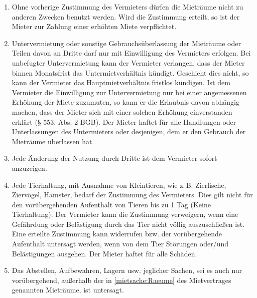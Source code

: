 \documentclass{scrreprt}[12pt,a4paper,twoside,duplex]
\begin{document}
\begin{contract}

\begin{enumerate}
  \item Ohne vorherige Zustimmung des Vermieters dürfen die Mieträume nicht zu
  anderen Zwecken benutzt werden. Wird die Zustimmung erteilt, so ist der Mieter
  zur Zahlung einer erhöhten Miete verpflichtet.
  \item Untervermietung oder sonstige Gebrauchsüberlassung der Mieträume oder
  Teilen davon an Dritte darf nur mit Einwilligung des Vermieters erfolgen. Bei
  unbefugter Untervermietung kann der Vermieter verlangen, dass der Mieter
  binnen Monatsfrist das Untermietverhältnis kündigt. Geschieht dies nicht, so
  kann der Vermieter das Hauptmietverhältnis fristlos kündigen. Ist dem
  Vermieter die Einwilligung zur Untervermietung nur bei einer angemessenen
  Erhöhung der Miete zuzumuten, so kann er die Erlaubnis davon abhängig machen,
  dass der Mieter sich mit einer solchen Erhöhung einverstanden erklärt (§ 553,
  Abs. 2 BGB). Der Mieter haftet für alle Handlungen oder Unterlassungen des
  Untermieters oder desjenigen, dem er den Gebrauch der Mieträume überlassen
  hat.
  \item Jede Änderung der Nutzung durch Dritte ist dem Vermieter sofort
  anzuzeigen.
  \item Jede Tierhaltung, mit Ausnahme von Kleintieren, wie z.\,B. Zierfische,
  Ziervögel, Hamster, bedarf der Zustimmung des Vermieters. Dies gilt nicht für
  den vo\-rü\-ber\-geh\-end\-en Aufenthalt von Tieren bis zu 1 Tag (Keine Tierhaltung).
  Der Vermieter kann die Zustimmung verweigern, wenn eine Gefährdung oder
  Belästigung durch das Tier nicht völlig auszuschließen ist. Eine erteilte
  Zustimmung kann widerrufen bzw. der vorübergehende Aufenthalt untersagt
  werden, wenn von dem Tier Störungen oder/und Belästigungen ausgehen. Der
  Mieter haftet für alle Schäden.
  \item Das Abstellen, Aufbewahren, Lagern usw. jeglicher Sachen, sei es auch
  nur vo\-rü\-ber\-geh\-end, außerhalb der in \ref{mietsache:Raeume} des Mietvertrages
  genannten Mieträume, ist untersagt.
\end{enumerate}
\end{contract}
\end{document}
